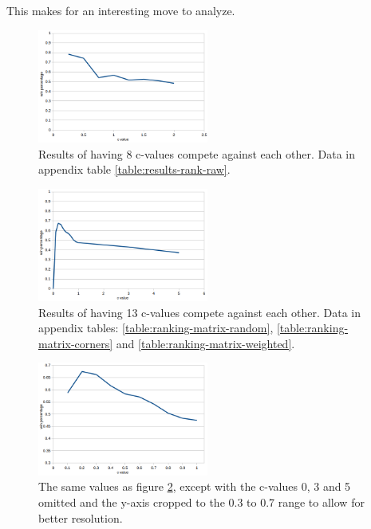 \documentclass[11pt,a4paper]{article}
\begin{document}
This makes for an interesting move to analyze.
\vfill
\pagebreak

\begin{figure}
    \includegraphics[width=0.5\textwidth]{images/rank-raw}
    \caption{Results of having 8 c-values compete against each other. Data in appendix table \ref{table:results-rank-raw}.}
    \label{fig:results-rank-raw}
\end{figure}
\begin{figure}
	\includegraphics[width=0.5\textwidth]{images/rank-015}
	\caption{Results of having 13 c-values compete against each other. Data in appendix tables: \ref{table:ranking-matrix-random}, \ref{table:ranking-matrix-corners} and \ref{table:ranking-matrix-weighted}.}
	\label{fig:results-rank-015}
\end{figure}
\begin{figure}[t]
	\includegraphics[width=0.5\textwidth]{images/rank-01}
	\caption{The same values as figure \ref{fig:results-rank-015}, except with the c-values 0, 3 and 5 omitted and the y-axis cropped to the 0.3 to 0.7 range to allow for better resolution.}
	\label{fig:results-rank-01}
\end{figure}
\end{document}
